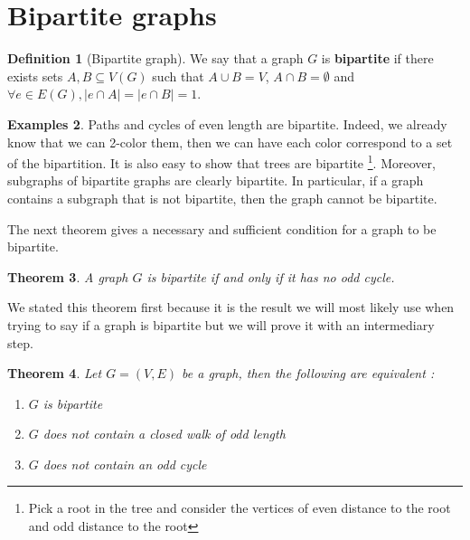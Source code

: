 \documentclass{tufte-handout}
\newtheorem{thm}{Theorem}
\theoremstyle{definition}
\newtheorem{defn}[thm]{Definition}
\newtheorem{exmps}[thm]{Examples}
\theoremstyle{remark}
\begin{document}
\section{Bipartite graphs}
\begin{defn}[Bipartite graph]
	We say that a graph $G$ is \textbf{bipartite} if there exists sets $A, B \subseteq V(G)$ such that $A \cup B = V$, $A \cap B = \emptyset$ and $\forall e \in E(G), |e \cap A| = |e \cap B| = 1$.
\end{defn}
\begin{exmps}
	Paths and cycles of even length are bipartite. Indeed, we already know that we can 2-color them, then we can have each color correspond to a set of the bipartition. It is also easy to show that trees are bipartite \footnote{Pick a root in the tree and consider the vertices of even distance to the root and odd distance to the root}. Moreover, subgraphs of bipartite graphs are clearly bipartite. In particular, if a graph contains a subgraph that is not bipartite, then the graph cannot be bipartite.
\end{exmps}
The next theorem gives a necessary and sufficient condition for a graph to be bipartite.
\begin{thm}
	A graph $G$ is bipartite if and only if it has no odd cycle.
\end{thm}
We stated this theorem first because it is the result we will most likely use when trying to say if a graph is bipartite but we will prove it with an intermediary step.
\begin{thm}
	Let $G = (V,E)$ be a graph, then the following are equivalent :
	\begin{enumerate}
		\item $G$ is bipartite
		\item $G$ does not contain a closed walk of odd length
		\item $G$ does not contain an odd cycle
	\end{enumerate}
\end{thm}
\end{document}
